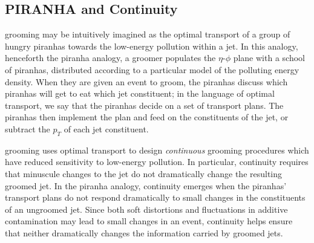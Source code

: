 \subsection{PIRANHA{} and Continuity}
\label{sec:pira_intro}

\PIRANHA{} grooming may be intuitively imagined as the optimal transport of a group of hungry piranhas towards the low-energy pollution within a jet.
%
In this analogy, henceforth the piranha analogy, a \PIRANHA{} groomer populates the \(\eta\)-\(\phi\) plane with a school of piranhas, distributed according to a particular model of the polluting energy density.
%
When they are given an event to groom, the piranhas discuss which piranhas will get to eat which jet constituent;
%
in the language of optimal transport, we say that the piranhas decide on a set of transport plans.
%
The piranhas then implement the plan and feed on the constituents of the jet, or subtract the \(p_T\) of each jet constituent.

\PIRANHA{} grooming uses optimal transport to design \textit{continuous} grooming procedures which have reduced sensitivity to low-energy pollution.
%
In particular, continuity requires that minuscule changes to the jet do not dramatically change the resulting groomed jet.
%
In the piranha analogy, continuity emerges when the piranhas' transport plans do not respond dramatically to small changes in the constituents of an ungroomed jet.
%
Since both soft distortions and fluctuations in additive contamination may lead to small changes in an event, continuity helps ensure that neither dramatically changes the information carried by groomed jets.

